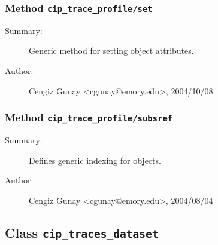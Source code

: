 \subsubsection[Method \texttt{set}]{Method \texttt{cip\_trace\_profile/set}}%
%
\label{ref_cip_trace_profile__set}%
\hypertarget{ref_cip_trace_profile__set}{}%
\begin{description}
\item[Summary:]Generic method for setting object attributes.
%
%
%
%
%
%
%
\item[Author:]%
Cengiz Gunay <cgunay@emory.edu>, 2004/10/08
%
\end{description}
\methodline%
\subsubsection[Method \texttt{subsref}]{Method \texttt{cip\_trace\_profile/subsref}}%
%
\label{ref_cip_trace_profile__subsref}%
\hypertarget{ref_cip_trace_profile__subsref}{}%
\begin{description}
\item[Summary:]Defines generic indexing for objects.
%
%
%
%
%
%
%
\item[Author:]%
Cengiz Gunay <cgunay@emory.edu>, 2004/08/04
%
\end{description}
\methodline%
\subsection{Class \texttt{cip\_traces\_dataset}}%
%
\label{ref_cip_traces_dataset}%
\hypertarget{ref_cip_traces_dataset}{}%
